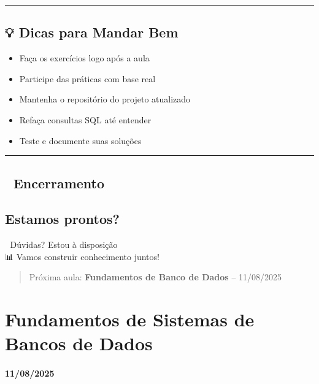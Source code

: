 \documentclass[
]{book}
\providecommand{\tightlist}{%
  \setlength{\itemsep}{0pt}\setlength{\parskip}{0pt}}
\begin{document}
\begin{center}\rule{0.5\linewidth}{0.5pt}\end{center}

\section{💡 Dicas para Mandar Bem}\label{dicas-para-mandar-bem}

\begin{itemize}
\tightlist
\item
  Faça os exercícios logo após a aula
\item
  Participe das práticas com base real
\item
  Mantenha o repositório do projeto atualizado
\item
  Refaça consultas SQL até entender
\item
  Teste e documente suas soluções
\end{itemize}

\begin{center}\rule{0.5\linewidth}{0.5pt}\end{center}

\section{🙌 Encerramento}\label{encerramento}

\section{Estamos prontos?}\label{estamos-prontos}

📧 Dúvidas? Estou à disposição\\
📊 Vamos construir conhecimento juntos!

\begin{quote}
Próxima aula: \textbf{Fundamentos de Banco de Dados} -- 11/08/2025
\end{quote}

\chapter{Fundamentos de Sistemas de Bancos de Dados}\label{fundamentos-de-sistemas-de-bancos-de-dados}

\subsubsection*{11/08/2025}\label{section-1}
\end{document}
